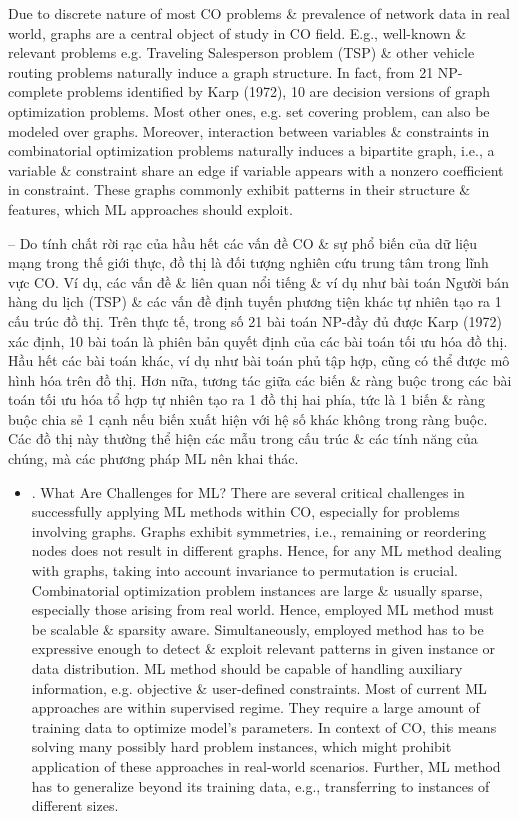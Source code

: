 \documentclass{article}
\begin{document}
\begin{itemize}
   Due to discrete nature of most CO problems \& prevalence of network data in real world, graphs are a central object of study in CO field. E.g., well-known \& relevant problems e.g. Traveling Salesperson problem (TSP) \& other vehicle routing problems naturally induce a graph structure. In fact, from 21 NP-complete problems identified by Karp (1972), 10 are decision versions of graph optimization problems. Most other ones, e.g. set covering problem, can also be modeled over graphs. Moreover, interaction between variables \& constraints in combinatorial optimization problems naturally induces a bipartite graph, i.e., a variable \& constraint share an edge if variable appears with a nonzero coefficient in constraint. These graphs commonly exhibit patterns in their structure \& features, which ML approaches should exploit.

   -- Do tính chất rời rạc của hầu hết các vấn đề CO \& sự phổ biến của dữ liệu mạng trong thế giới thực, đồ thị là đối tượng nghiên cứu trung tâm trong lĩnh vực CO. Ví dụ, các vấn đề \& liên quan nổi tiếng \& ví dụ như bài toán Người bán hàng du lịch (TSP) \& các vấn đề định tuyến phương tiện khác tự nhiên tạo ra 1 cấu trúc đồ thị. Trên thực tế, trong số 21 bài toán NP-đầy đủ được Karp (1972) xác định, 10 bài toán là phiên bản quyết định của các bài toán tối ưu hóa đồ thị. Hầu hết các bài toán khác, ví dụ như bài toán phủ tập hợp, cũng có thể được mô hình hóa trên đồ thị. Hơn nữa, tương tác giữa các biến \& ràng buộc trong các bài toán tối ưu hóa tổ hợp tự nhiên tạo ra 1 đồ thị hai phía, tức là 1 biến \& ràng buộc chia sẻ 1 cạnh nếu biến xuất hiện với hệ số khác không trong ràng buộc. Các đồ thị này thường thể hiện các mẫu trong cấu trúc \& các tính năng của chúng, mà các phương pháp ML nên khai thác.
    \begin{itemize}
        \item {. What Are Challenges for ML?} There are several critical challenges in successfully applying ML methods within CO, especially for problems involving graphs. Graphs exhibit symmetries, i.e., remaining or reordering nodes does not result in different graphs. Hence, for any ML method dealing with graphs, taking into account invariance to permutation is crucial. Combinatorial optimization problem instances are large \& usually sparse, especially those arising from real world. Hence, employed ML method must be scalable \& sparsity aware.  Simultaneously, employed method has to be expressive enough to detect \& exploit relevant patterns in given instance or data distribution. ML method should be capable of handling auxiliary information, e.g. objective \& user-defined constraints. Most of current ML approaches are within supervised regime. They require a large amount of training data to optimize model's parameters. In context of CO, this means solving many possibly hard problem instances, which might prohibit application of these approaches in real-world scenarios. Further, ML method has to generalize beyond its training data, e.g., transferring to instances of different sizes.


\end{itemize}
\end{itemize}
\end{document}
